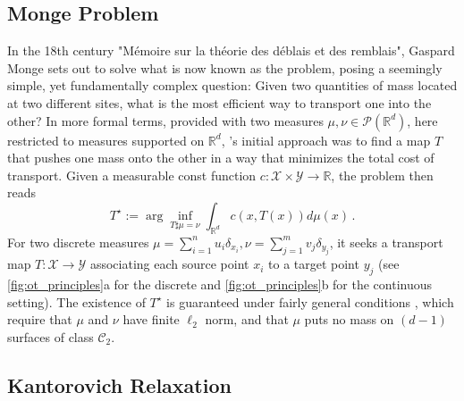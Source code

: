 \subsection{Monge Problem} \label{sec:background_monge}

In the 18th century "M{\'e}moire sur la th{\'e}orie des d{\'e}blais et des remblais", Gaspard Monge sets out to solve what is now known as the \citeauthor{monge1781histoire} problem, posing a seemingly simple, yet fundamentally complex question: Given two quantities of mass located at two different sites, what is the most efficient way to transport one into the other?
In more formal terms, provided with two measures $\mu, \nu\in \mathcal{P}(\mathbb{R}^d)$, here restricted to measures supported on $\mathbb{R}^d$, \citeauthor{monge1781histoire}'s initial approach was to find a map $T$ that pushes one mass onto the other in a way that minimizes the total cost of transport.
Given a measurable const function $c: \mathcal{X} \times \mathcal{Y} \rightarrow \mathbb{R}$, the \citeauthor{monge1781histoire} problem then reads
\begin{equation}\label{eq:monge}
T^\star := \arg\inf_{T\sharp\mu=\nu}\int_{\mathbb{R}^d} c(x, T(x)) d\mu(x)\,.
\end{equation}
For two discrete measures $\mu=\sum_{i=1}^n u_i \delta_{x_{i}}, \nu=\sum_{j=1}^m v_j \delta_{y_{j}}$, it seeks a transport map $T: \mathcal{X} \rightarrow \mathcal{Y}$ associating each source point $x_i$ to a target point $y_j$ (see \cref{fig:ot_principles}a for the discrete and \cref{fig:ot_principles}b for the continuous setting).
The existence of $T^\star$ is guaranteed under fairly general conditions \citep[Theorem 1.22]{santambrogio2015optimal}, which require that $\mu$ and $\nu$ have finite $\ell_2$ norm, and that $\mu$ puts no mass on $(d-1)$ surfaces of class $\mathcal{C}_2$.


\subsection{Kantorovich Relaxation} \label{sec:background_kantorovich}

